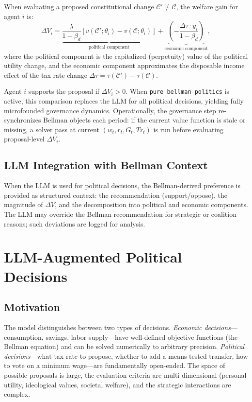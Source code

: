 \documentclass[12pt]{article}
\newcommand{\calC}{\mathcal{C}}
\begin{document}
When evaluating a proposed constitutional change $\calC' \neq \calC$, the welfare gain for agent $i$ is:
\begin{equation}\label{eq:proposal_eval}
  \Delta V_i = \underbrace{\frac{\lambda}{1 - \beta_d}\left[v(\calC'; \theta_i) - v(\calC; \theta_i)\right]}_{\text{political component}} + \underbrace{\left(-\frac{\Delta\tau \cdot y_i}{1 - \beta_d}\right)}_{\text{economic component}},
\end{equation}
where the political component is the capitalized (perpetuity) value of the political utility change, and the economic component approximates the disposable income effect of the tax rate change $\Delta\tau = \tau(\calC') - \tau(\calC)$.

Agent $i$ supports the proposal if $\Delta V_i > 0$. When \texttt{pure\_bellman\_politics} is active, this comparison replaces the LLM for all political decisions, yielding fully microfounded governance dynamics.
Operationally, the governance step re-synchronizes Bellman objects each period: if the current value function is stale or missing, a solver pass at current $(w_t, r_t, G_t, Tr_t)$ is run before evaluating proposal-level $\Delta V_i$.

\subsection{LLM Integration with Bellman Context}

When the LLM is used for political decisions, the Bellman-derived preference is provided as structured context: the recommendation (support/oppose), the magnitude of $\Delta V$, and the decomposition into political and economic components. The LLM may override the Bellman recommendation for strategic or coalition reasons; such deviations are logged for analysis.


\section{LLM-Augmented Political Decisions}\label{sec:llm}

\subsection{Motivation}\label{sec:llm_motivation}

The model distinguishes between two types of decisions. \emph{Economic decisions}---consumption, savings, labor supply---have well-defined objective functions (the Bellman equation) and can be solved numerically to arbitrary precision. \emph{Political decisions}---what tax rate to propose, whether to add a means-tested transfer, how to vote on a minimum wage---are fundamentally open-ended. The space of possible proposals is large, the evaluation criteria are multi-dimensional (personal utility, ideological values, societal welfare), and the strategic interactions are complex.
\end{document}
